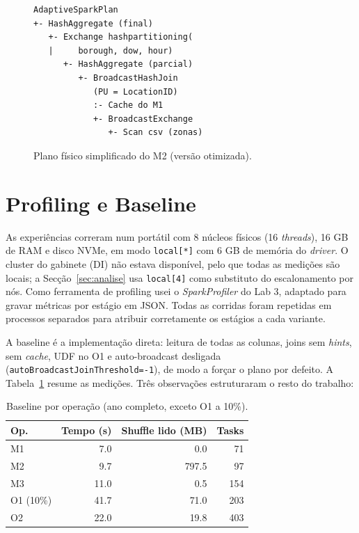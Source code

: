 \documentclass[sigconf]{acmart}
\begin{document}
\begin{figure}[t]
\centering
\begin{minipage}{0.92\columnwidth}
\small
\begin{verbatim}
AdaptiveSparkPlan
+- HashAggregate (final)
   +- Exchange hashpartitioning(
   |     borough, dow, hour)
      +- HashAggregate (parcial)
         +- BroadcastHashJoin
            (PU = LocationID)
            :- Cache do M1
            +- BroadcastExchange
               +- Scan csv (zonas)
\end{verbatim}
\end{minipage}
\caption{Plano físico simplificado do M2 (versão otimizada).}
\label{fig:plan}
\end{figure}

\section{Profiling e Baseline}

As experiências correram num portátil com 8 núcleos físicos (16
\emph{threads}), 16 GB de RAM e disco NVMe, em modo \texttt{local[*]} com
6 GB de memória do \emph{driver}. O cluster do gabinete (DI) não estava
disponível, pelo que todas as medições são locais; a
Secção~\ref{sec:analise} usa \texttt{local[4]} como substituto do
escalonamento por nós. Como ferramenta de profiling usei o
\emph{SparkProfiler} do Lab 3, adaptado para gravar métricas por estágio
em JSON. Todas as corridas foram repetidas em processos separados para
atribuir corretamente os estágios a cada variante.

A baseline é a implementação direta: leitura de todas as colunas, joins
sem \emph{hints}, sem \emph{cache}, UDF no O1 e auto-broadcast desligada
(\texttt{autoBroadcastJoinThreshold=-1}), de modo a forçar o plano por
defeito. A Tabela~\ref{tab:baseline} resume as medições. Três observações
estruturaram o resto do trabalho:

\begin{table}[t]
\centering
\small
\caption{Baseline por operação (ano completo, exceto O1 a 10\%).}
\label{tab:baseline}
\begin{tabular}{lrrr}
\toprule
Op. & Tempo (s) & Shuffle lido (MB) & Tasks \\
\midrule
M1 & 7.0 & 0.0 & 71 \\
M2 & 9.7 & 797.5 & 97 \\
M3 & 11.0 & 0.5 & 154 \\
O1 (10\%) & 41.7 & 71.0 & 203 \\
O2 & 22.0 & 19.8 & 403 \\
\bottomrule
\end{tabular}
\end{table}
\end{document}
